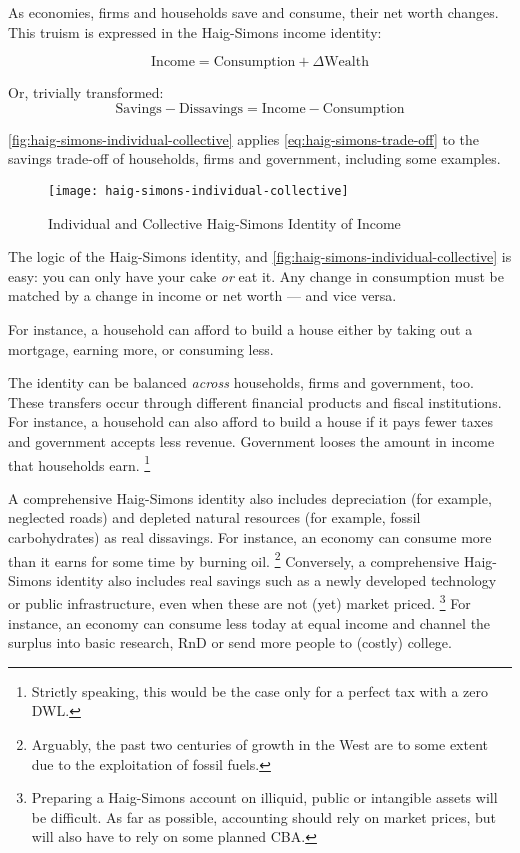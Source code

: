 As economies, firms and households save and consume, their net worth changes.
This truism is expressed in the Haig-Simons income identity:

\begin{equation}
	\label{eq:haig-simons}
	\text{Income}=\text{Consumption}+\Delta\text{Wealth}
\end{equation}

Or, trivially transformed:
\begin{equation}
	\label{eq:haig-simons-trade-off}
	\text{Savings}-\text{Dissavings}=\text{Income}-\text{Consumption}
\end{equation}

\autoref{fig:haig-simons-individual-collective} applies \autoref{eq:haig-simons-trade-off} to the savings trade-off of households, firms and government, including some examples.

\begin{figure}[htbp]
	\centering
	\texttt{[image: haig-simons-individual-collective]}
	\caption{Individual and Collective Haig-Simons Identity of Income}
	\label{fig:haig-simons-individual-collective} %
\end{figure}

The logic of the Haig-Simons identity, and \autoref{fig:haig-simons-individual-collective} is easy:
you can only have your cake \emph{or} eat it.
Any change in consumption must be matched by a change in income or net worth --- and vice versa.

For instance, a household can afford to build a house either by taking out a mortgage, earning more, or consuming less.

The identity can be balanced \emph{across} households, firms and government, too.
These transfers occur through different financial products and fiscal institutions.
For instance, a household can also afford to build a house if it pays fewer taxes and government accepts less revenue.
Government looses the amount in income that households earn.
\footnote{
	Strictly speaking, this would be the case only for a perfect tax with a zero \gls{DWL}.
}

A comprehensive Haig-Simons identity also includes depreciation (for example, neglected roads) and depleted natural resources (for example, fossil carbohydrates) as real dissavings.
For instance, an economy can consume more than it earns for some time by burning oil.
\footnote{
	Arguably, the past two centuries of growth in the West are to some extent due to the exploitation of fossil fuels.
}
Conversely, a comprehensive Haig-Simons identity also includes real savings such as a newly developed technology or public infrastructure, even when these are not (yet) market priced.
\footnote{
	Preparing a Haig-Simons account on illiquid, public or intangible assets will be difficult.
	As far as possible, accounting should rely on market prices, but will also have to rely on  some planned \gls{CBA}.
}
For instance, an economy can consume less today at equal income and channel the surplus into basic research, \gls{RnD} or send more people to (costly) college.

